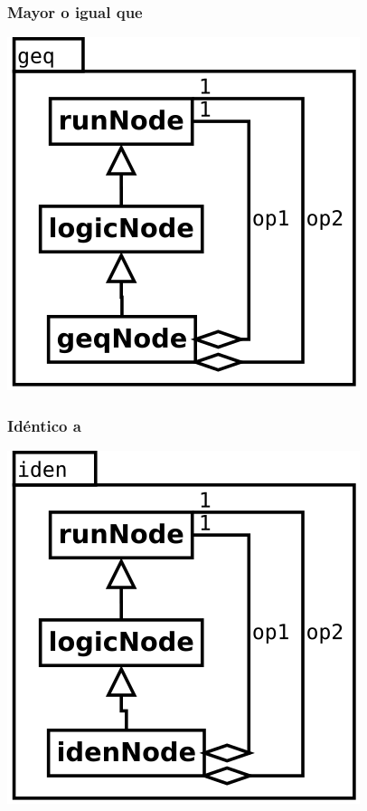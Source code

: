 \subsubsection {Mayor o igual que}
\begin{center}
\includegraphics[scale=0.4]{geq.png} \\
\end{center}


\subsubsection {Idéntico a}
\begin{center}
\includegraphics[scale=0.4]{iden.png} \\
\end{center}

